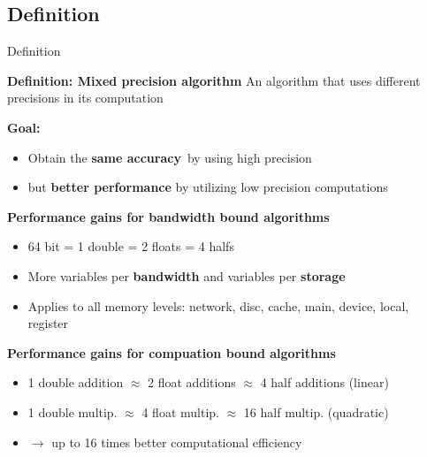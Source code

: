 \documentclass[10pt]{beamer}
\begin{document}
\subsection{Definition}
\begin{frame}{Definition}
\begin{block}{\textbf{Definition: Mixed precision algorithm}}
An algorithm that 
uses different precisions in its computation
\end{block}

\textbf{Goal: } 
\begin{itemize}
\item[] Obtain the \textbf{same accuracy}~by using 
high precision
\item[] but \textbf{better performance}
by utilizing low precision computations
\end{itemize}
\textbf{Performance gains for bandwidth bound algorithms}~\\
 \begin{itemize}
  \item 64 bit = 1 double = 2 floats = 4 halfs
  \item More variables per \textbf{bandwidth} and variables per \textbf{storage}
  \item Applies to all memory levels: network, disc, cache, main, device, local, register 
 \end{itemize}
\textbf{Performance gains for compuation bound algorithms}~\\
 \begin{itemize}
  \item 1 double addition $\approx$ 2 float additions $\approx$ 4 half additions (linear)
  \item 1 double multip. $\approx$ 4 float multip. $\approx$ 16 half multip. (quadratic)
  \item $\rightarrow$ up to 16 times better computational efficiency
 \end{itemize}

\end{frame}
\end{document}

